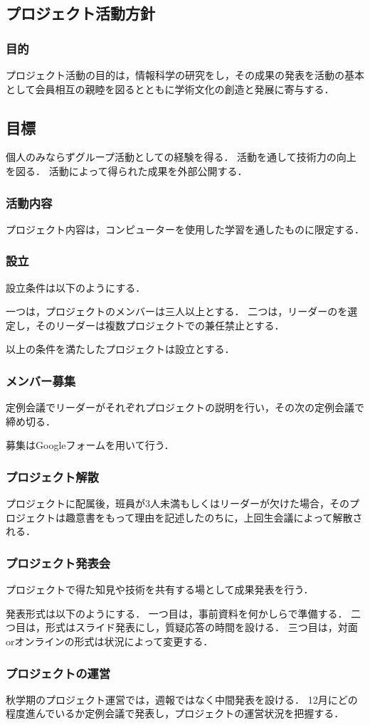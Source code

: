 \subsection*{プロジェクト活動方針}


\subsubsection*{目的}
プロジェクト活動の目的は，情報科学の研究をし，その成果の発表を活動の基本として会員相互の親睦を図るとともに学術文化の創造と発展に寄与する．

\subsection*{目標}
個人のみならずグループ活動としての経験を得る．
活動を通して技術力の向上を図る．
活動によって得られた成果を外部公開する．

\subsubsection*{活動内容}
プロジェクト内容は，コンピューターを使用した学習を通したものに限定する．

\subsubsection*{設立}
設立条件は以下のようにする．

一つは，プロジェクトのメンバーは三人以上とする．
二つは，リーダーのを選定し，そのリーダーは複数プロジェクトでの兼任禁止とする．

以上の条件を満たしたプロジェクトは設立とする．

\subsubsection*{メンバー募集}
定例会議でリーダーがそれぞれプロジェクトの説明を行い，その次の定例会議で締め切る．

募集はGoogleフォームを用いて行う．

\subsubsection*{プロジェクト解散}
プロジェクトに配属後，班員が3人未満もしくはリーダーが欠けた場合，そのプロジェクトは趣意書をもって理由を記述したのちに，上回生会議によって解散される．

\subsubsection*{プロジェクト発表会}
プロジェクトで得た知見や技術を共有する場として成果発表を行う．

発表形式は以下のようにする．
一つ目は，事前資料を何かしらで準備する．
二つ目は，形式はスライド発表にし，質疑応答の時間を設ける．
三つ目は，対面orオンラインの形式は状況によって変更する．

\subsubsection*{プロジェクトの運営}
秋学期のプロジェクト運営では，週報ではなく中間発表を設ける．
12月にどの程度進んでいるか定例会議で発表し，プロジェクトの運営状況を把握する．
